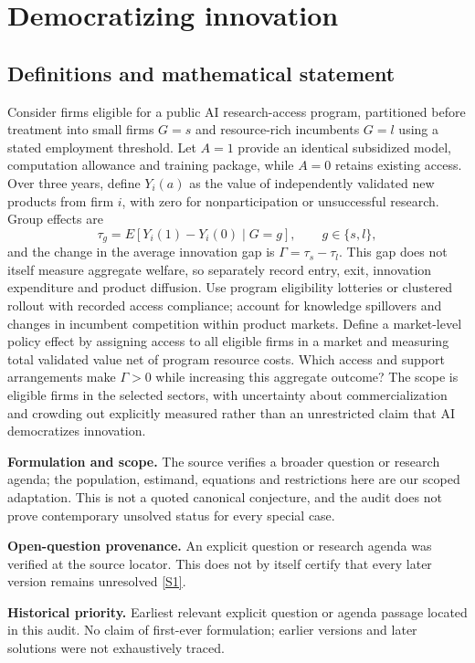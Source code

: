 \documentclass[11pt]{article}
\newcommand{\sref}[2]{\hyperlink{source:#1:#2}{[S#2]}}
\begin{document}
\section*{Democratizing innovation}\label{30007694}
\subsection{Definitions and mathematical statement}
Consider firms eligible for a public AI research-access program, partitioned before treatment into small firms \(G=s\) and resource-rich incumbents \(G=l\) using a stated employment threshold. Let \(A=1\) provide an identical subsidized model, computation allowance and training package, while \(A=0\) retains existing access. Over three years, define \(Y_i(a)\) as the value of independently validated new products from firm \(i\), with zero for nonparticipation or unsuccessful research. Group effects are
\[
\tau_g=E[Y_i(1)-Y_i(0)\mid G=g],\qquad g\in\{s,l\},
\]
and the change in the average innovation gap is \(\Gamma=\tau_s-\tau_l\). This gap does not itself measure aggregate welfare, so separately record entry, exit, innovation expenditure and product diffusion. Use program eligibility lotteries or clustered rollout with recorded access compliance; account for knowledge spillovers and changes in incumbent competition within product markets. Define a market-level policy effect by assigning access to all eligible firms in a market and measuring total validated value net of program resource costs. Which access and support arrangements make \(\Gamma>0\) while increasing this aggregate outcome? The scope is eligible firms in the selected sectors, with uncertainty about commercialization and crowding out explicitly measured rather than an unrestricted claim that AI democratizes innovation.

\par\textbf{Formulation and scope.} The source verifies a broader question or research agenda; the population, estimand, equations and restrictions here are our scoped adaptation. This is not a quoted canonical conjecture, and the audit does not prove contemporary unsolved status for every special case.

\par\textbf{Open-question provenance.} An explicit question or research agenda was verified at the source locator. This does not by itself certify that every later version remains unresolved \sref{30007694}{1}.

\par\textbf{Historical priority.} Earliest relevant explicit question or agenda passage located in this audit. No claim of first-ever formulation; earlier versions and later solutions were not exhaustively traced.
\end{document}
